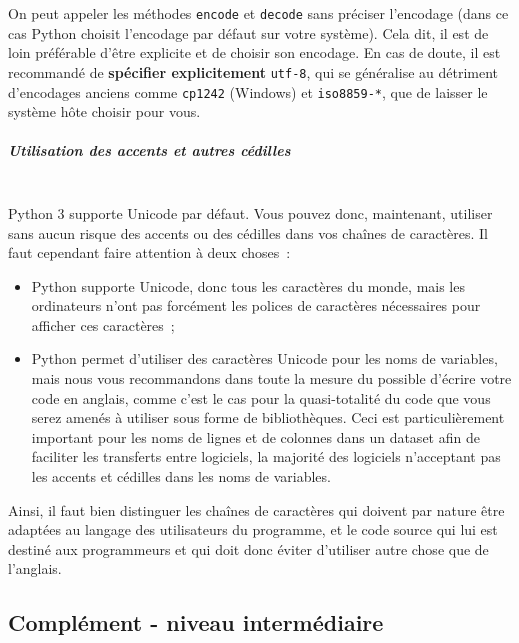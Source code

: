     On peut appeler les méthodes \texttt{encode} et \texttt{decode} sans
préciser l'encodage (dans ce cas Python choisit l'encodage par défaut
sur votre système). Cela dit, il est de loin préférable d'être explicite
et de choisir son encodage. En cas de doute, il est recommandé de
\textbf{spécifier explicitement} \texttt{utf-8}, qui se généralise au
détriment d'encodages anciens comme \texttt{cp1242} (Windows) et
\texttt{iso8859-*}, que de laisser le système hôte choisir pour vous.

    \hypertarget{utilisation-des-accents-et-autres-cuxe9dilles}{%
\subparagraph{Utilisation des accents et autres
cédilles\\\\}\label{utilisation-des-accents-et-autres-cuxe9dilles}}

    Python 3 supporte Unicode par défaut. Vous pouvez donc, maintenant,
utiliser sans aucun risque des accents ou des cédilles dans vos chaînes
de caractères. Il faut cependant faire attention à deux choses~:

\begin{itemize}
	\item 
	Python supporte Unicode, donc tous les caractères du monde, mais les
	ordinateurs n'ont pas forcément les polices de caractères nécessaires
	pour afficher ces caractères~;
	\item
	Python permet d'utiliser des caractères
	Unicode pour les noms de variables, mais nous vous recommandons dans
	toute la mesure du possible d'écrire votre code en anglais, comme c'est
	le cas pour la quasi-totalité du code que vous serez amenés à utiliser
	sous forme de bibliothèques. Ceci est particulièrement important pour
	les noms de lignes et de colonnes dans un dataset afin de faciliter les
	transferts entre logiciels, la majorité des logiciels n'acceptant pas
	les accents et cédilles dans les noms de variables.
\end{itemize}

Ainsi, il faut bien distinguer les chaînes de caractères qui doivent par
nature être adaptées au langage des utilisateurs du programme, et le
code source qui lui est destiné aux programmeurs et qui doit donc éviter
d'utiliser autre chose que de l'anglais.

    \hypertarget{compluxe9ment---niveau-intermuxe9diaire}{%
\subsection{Complément - niveau
intermédiaire}\label{compluxe9ment---niveau-intermuxe9diaire}}

